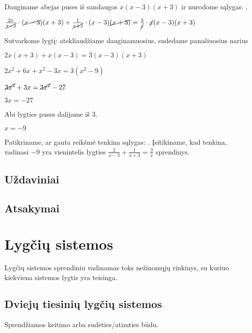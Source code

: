 \documentclass[12pt,a4paper]{report}
\numberwithin{table}{chapter}
\numberwithin{figure}{chapter}
\theoremstyle{definition}
\begin{document}
Dauginame abejas puses iš sandaugos $x(x-3)(x+3)$ ir nurodome sąlygas: .

$\frac{2x}{\cancel{x-3}}\cdot (\cancel{x-3})(x+3)+\frac{1}{\cancel{x+3}} \cdot (x-3)\cancel{(x+3)} =\frac{3}{ \cancel{x}} \cdot \cancel{x}(x-3)(x+3)$

Sutvarkome lygtį: atskliaudžiame dauginamuosius, sudedame panašiuosius narius

$2x(x+3)+x(x-3) =3(x-3)(x+3)$

$2x^2+6x+x^2-3x =3(x^2-9)$

$\cancel{3x^2}+3x =\cancel{3x^2}-27$

$3x=-27$

Abi lygties puses dalijame iš 3.

$x=-9$

Patikriname, ar gauta reikšmė tenkina sąlygas:  . Įsitikiname, kad tenkina, vadinasi $-9$ yra vienintelis lygties $\frac{2}{x-3}+\frac{1}{x+3}=\frac{3}{x}$ sprendinys.
\noindent\makebox[\linewidth]{\rule{\paperwidth}{0.4pt}}
\section{Uždaviniai}
\section{Atsakymai}
\newpage

\chapter{Lygčių sistemos}
Lygčių sistemos sprendiniu vadinamas toks nežinomųjų rinkinys, su kuriuo kiekviena sistemos lygtis yra teisinga.
\section{Dviejų tiesinių lygčių sistemos}
Sprendžiamos keitimo arba sudėties/atimties būdu.
\end{document}
